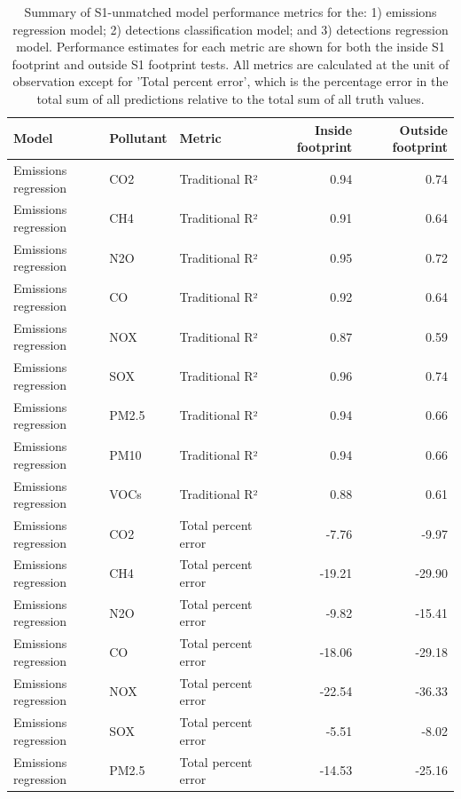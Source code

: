 \begin{table}[!h]
\centering
\caption{\label{tab:all_performance_metrics_table}Summary of S1-unmatched model performance metrics for the: 1) emissions regression model; 2) detections classification model; and 3) detections regression model. Performance estimates for each metric are shown for both the inside S1 footprint and outside S1 footprint tests. All metrics are calculated at the unit of observation except for 'Total percent error', which is the percentage error in the total sum of all predictions relative to the total sum of all truth values.}
\centering
\fontsize{7}{9}\selectfont
\begin{tabular}[t]{l|l|l|r|r}
\hline
Model & Pollutant & Metric & Inside footprint & Outside footprint\\
\hline
Emissions regression & CO2 & Traditional R² & 0.94 & 0.74\\
\hline
Emissions regression & CH4 & Traditional R² & 0.91 & 0.64\\
\hline
Emissions regression & N2O & Traditional R² & 0.95 & 0.72\\
\hline
Emissions regression & CO & Traditional R² & 0.92 & 0.64\\
\hline
Emissions regression & NOX & Traditional R² & 0.87 & 0.59\\
\hline
Emissions regression & SOX & Traditional R² & 0.96 & 0.74\\
\hline
Emissions regression & PM2.5 & Traditional R² & 0.94 & 0.66\\
\hline
Emissions regression & PM10 & Traditional R² & 0.94 & 0.66\\
\hline
Emissions regression & VOCs & Traditional R² & 0.88 & 0.61\\
\hline
Emissions regression & CO2 & Total percent error & -7.76 & -9.97\\
\hline
Emissions regression & CH4 & Total percent error & -19.21 & -29.90\\
\hline
Emissions regression & N2O & Total percent error & -9.82 & -15.41\\
\hline
Emissions regression & CO & Total percent error & -18.06 & -29.18\\
\hline
Emissions regression & NOX & Total percent error & -22.54 & -36.33\\
\hline
Emissions regression & SOX & Total percent error & -5.51 & -8.02\\
\hline
Emissions regression & PM2.5 & Total percent error & -14.53 & -25.16\\
\hline

\end{tabular}
\end{table}
